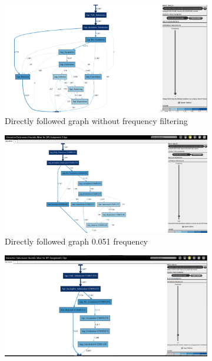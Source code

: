 \begin{figure}[h]
\centering
\begin{subfigure}{.49\textwidth}
  \centering
  \includegraphics[width=\linewidth]{App_DirectlyFollowedFreq0.PNG}
  \caption{Directly followed graph without frequency filtering}
  \label{fig:APP_DFG0}
\end{subfigure}%
\begin{subfigure}{.49\textwidth}
  \centering
  \includegraphics[width=\linewidth]{App_DirectlyFollowedFreq0-051.PNG}
  \caption{Directly followed graph 0.051 frequency}
  \label{fig:APP_DFG0-51}
\end{subfigure}
\begin{subfigure}{.49\textwidth}
  \centering
  \includegraphics[width=\linewidth]{App_DirectlyFollowedFreq0-1.PNG}

\end{subfigure}
\end{figure}
